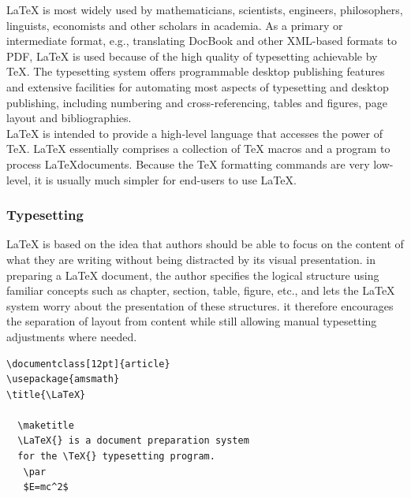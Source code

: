 \noindent\LaTeX{} is most widely used by mathematicians, scientists, 
engineers, philosophers, linguists, economists and other scholars in 
academia. As a primary or intermediate format, e.g., translating DocBook 
and other XML-based formats to PDF, \LaTeX{} is used because of the 
high quality of typesetting achievable by \TeX. The typesetting system 
offers programmable desktop publishing features and extensive facilities 
for automating most aspects of typesetting and desktop publishing, 
including numbering and cross-referencing, tables and figures, 
page layout and bibliographies.\\

\noindent\LaTeX{} is intended to provide a high-level language that
accesses the power of \TeX. \LaTeX{} essentially comprises a
collection of \TeX{} macros and a program to process \LaTeX documents. 
Because the \TeX{} formatting commands are very low-level, it is usually 
much simpler for end-users to use \LaTeX{}.


\subsubsection{Typesetting}
\LaTeX{} is based on the idea that authors should be able to focus on 
the content of what they are writing without being distracted by its 
visual presentation. in preparing a \LaTeX{} document, the author 
specifies the logical structure using familiar concepts such as 
chapter, section, table, figure, etc., and lets the \LaTeX{} system 
worry about the presentation of these structures. it therefore 
encourages the separation of layout from content while still allowing 
manual typesetting adjustments where needed. 

\begin{verbatim}
\documentclass[12pt]{article}
\usepackage{amsmath}
\title{\LaTeX}

  \maketitle 
  \LaTeX{} is a document preparation system 
  for the \TeX{} typesetting program.
   \par 
   $E=mc^2$

\end{verbatim}

